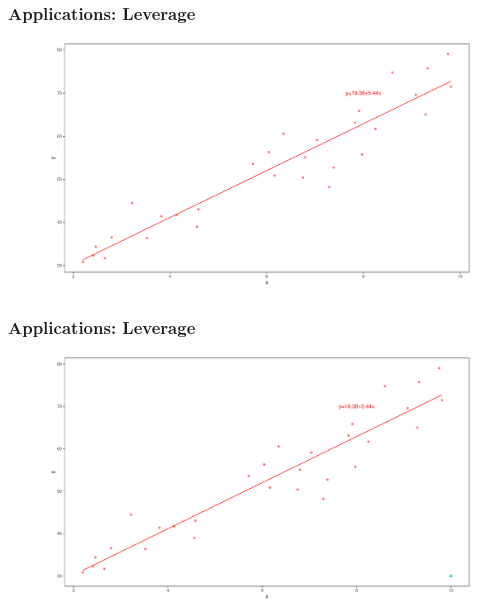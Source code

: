 \documentclass[
  shownotes,
  xcolor={svgnames},
  hyperref={colorlinks,citecolor=DarkBlue,linkcolor=DarkRed,urlcolor=DarkBlue}
  , aspectratio=169]{beamer}
\begin{document}
\begin{frame}
\frametitle{Applications: Leverage}

\begin{figure}[H] \centering
  \centering
  \includegraphics[scale=0.35]{figures/fig_1b.pdf}
  \\
  \tiny
\end{figure}

\end{frame}
\begin{frame}
\frametitle{Applications: Leverage}

\begin{figure}[H] \centering
  \centering
  \includegraphics[scale=0.35]{figures/fig_1c.pdf}
  \\
  \tiny
\end{figure}


\end{frame}
\end{document}
